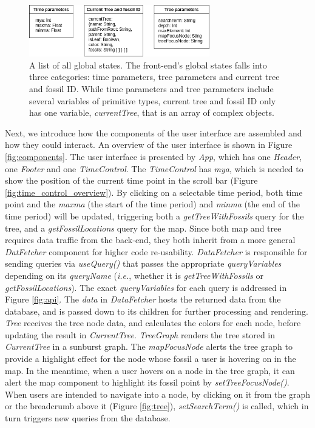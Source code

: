 \documentclass[11pt, a4paper,oneside,chapterprefix=false]{scrbook}
\begin{document}
\begin{figure}[h]
	\centering
	\includegraphics[width=0.7\textwidth]{figures/implementation/global_state}
	\caption{A list of all global states. The front-end's global states falls into three categories: time parameters, tree parameters and current tree and fossil ID. While time parameters and tree parameters include several variables of primitive types, current tree and fossil ID only has one variable, \emph{currentTree}, that is an array of complex objects.}
	\label{fig:global_state}
\end{figure}


Next, we introduce how the components of the user interface are assembled and how they could interact. An overview of the user interface is shown in Figure \ref{fig:components}. The user interface is presented by \emph{App}, which has one \emph{Header}, one \emph{Footer} and one \emph{TimeControl}. The \emph{TimeControl} has \emph{mya}, which is needed to show the position of the current time point in the scroll bar (Figure \ref{fig:time_control_overview}). By clicking on a selectable time period, both time point and the \emph{maxma} (the start of the time period) and \emph{minma} (the end of the time period) will be updated, triggering both a \emph{getTreeWithFossils} query for the tree, and a \emph{getFossilLocations} query for the map. Since both map and tree requires data traffic from the back-end, they both inherit from a more general \emph{DatFetcher} component for higher code re-usability. \emph{DataFetcher} is responsible for sending queries via \emph{useQuery()} that passes the appropriate \emph{queryVariables} depending on its \emph{queryName} (\emph{i.e.}, whether it is \emph{getTreeWithFossils} or \emph{getFossilLocations}). The exact \emph{queryVariables} for each query is addressed in Figure \ref{fig:api}. The \emph{data} in \emph{DataFetcher} hosts the returned data from the database, and is passed down to its children for further processing and rendering. \\

\emph{Tree} receives the tree node data, and calculates the colors for each node, before updating the result in \emph{CurrentTree}. \emph{TreeGraph} renders the tree stored in \emph{CurrentTree} in a sunburst graph. The \emph{mapFocusNode} alerts the tree graph to provide a highlight effect for the node whose fossil a user is hovering on in the map. In the meantime, when a user hovers on a node in the tree graph, it can alert the map component to highlight its fossil point by \emph{setTreeFocusNode()}. When users are intended to navigate into a node, by clicking on it from the graph or the breadcrumb above it (Figure \ref{fig:tree}), \emph{setSearchTerm()} is called, which in turn triggers new queries from the database. \\
\end{document}
